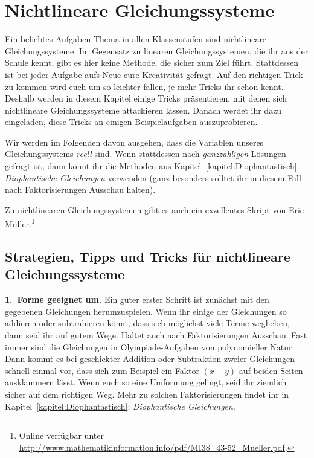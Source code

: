 \section{Nichtlineare Gleichungssysteme}\label{kapitel:Gleichungssysteme}

Ein beliebtes Aufgaben-Thema in allen Klassenstufen sind nichtlineare Gleichungssysteme. Im Gegensatz zu linearen Gleichungssystemen, die ihr aus der Schule kennt, gibt es hier keine Methode, die sicher zum Ziel führt. Stattdessen ist bei jeder Aufgabe aufs Neue eure Kreativität gefragt. Auf den richtigen Trick zu kommen wird euch um so leichter fallen, je mehr Tricks ihr schon kennt. Deshalb werden in diesem Kapitel einige Tricks präsentieren, mit denen sich nichtlineare Gleichungssysteme attackieren lassen. Danach werdet ihr dazu eingeladen, diese Tricks an einigen Beispielaufgaben auszuprobieren.

Wir werden im Folgenden davon ausgehen, dass die Variablen unseres Gleichungssystems \emph{reell} sind. Wenn stattdessen nach \emph{ganzzahligen} Lösungen gefragt ist, dann könnt ihr die Methoden aus Kapitel~\ref{kapitel:Diophantastisch}: \emph{Diophantische Gleichungen} verwenden (ganz besonders solltet ihr in diesem Fall nach Faktorisierungen Ausschau halten).

Zu nichtlinearen Gleichungssystemen gibt es auch ein exzellentes Skript von Eric Müller.\footnote{Online verfügbar unter \url{http://www.mathematikinformation.info/pdf/MI38_43-52_Mueller.pdf}.}

\subsection*{Strategien, Tipps und Tricks für nichtlineare Gleichungssysteme}

\textbf{1.~Forme geeignet um.} Ein guter erster Schritt ist zunächst mit den gegebenen Gleichungen herumzuspielen. Wenn ihr einige der Gleichungen so addieren oder subtrahieren könnt, dass sich möglichst viele Terme wegheben, dann seid ihr  auf gutem Wege. Haltet auch nach Faktorisierungen Ausschau. Fast immer sind die Gleichungen in Olympiade-Aufgaben von polynomieller Natur. Dann kommt es bei geschickter Addition oder Subtraktion zweier Gleichungen schnell einmal vor, dass sich zum Beispiel ein Faktor $(x-y)$ auf beiden Seiten ausklammern lässt. Wenn euch so eine Umformung gelingt, seid ihr ziemlich sicher auf dem richtigen Weg. Mehr zu solchen Faktorisierungen findet ihr in Kapitel~\ref{kapitel:Diophantastisch}: \emph{Diophantische Gleichungen}.

